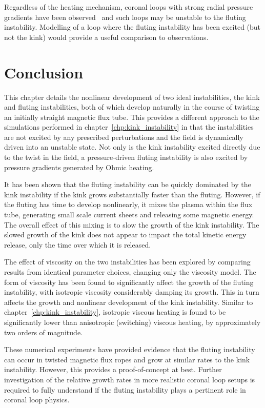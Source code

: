 Regardless of the heating mechanism, coronal loops with strong radial pressure gradients have been observed~\cite{foukalTemperatureStructurePressure1975} and such loops may be unstable to the fluting instability. Modelling of a loop where the fluting instability has been excited (but not the kink) would provide a useful comparison to observations.

\section{Conclusion}

This chapter details the nonlinear development of two ideal instabilities, the kink and fluting instabilities, both of which develop naturally in the course of twisting an initially straight magnetic flux tube. This provides a different approach to the simulations performed in chapter~\ref{chp:kink_instability} in that the instabilities are not excited by any prescribed perturbations and the field is dynamically driven into an unstable state. Not only is the kink instability excited directly due to the twist in the field, a pressure-driven fluting instability is also excited by pressure gradients generated by Ohmic heating.

It has been shown that the fluting instability can be quickly dominated by the kink instability if the kink grows substantially faster than the fluting. However, if the fluting has time to develop nonlinearly, it mixes the plasma within the flux tube, generating small scale current sheets and releasing some magnetic energy. The overall effect of this mixing is to slow the growth of the kink instability. The slowed growth of the kink does not appear to impact the total kinetic energy release, only the time over which it is released. 

The effect of viscosity on the two instabilities has been explored by comparing results from identical parameter choices, changing only the viscosity model. The form of viscosity has been found to significantly affect the growth of the fluting instability, with isotropic viscosity considerably damping its growth. This in turn affects the growth and nonlinear development of the kink instability. Similar to chapter~\ref{chp:kink_instability}, isotropic viscous heating is found to be significantly lower than anisotropic (switching) viscous heating, by approximately two orders of magnitude.

These numerical experiments have provided evidence that the fluting instability can occur in twisted magnetic flux ropes and grow at similar rates to the kink instability. However, this provides a proof-of-concept at best. Further investigation of the relative growth rates in more realistic coronal loop setups is required to fully understand if the fluting instability plays a pertinent role in coronal loop physics.
